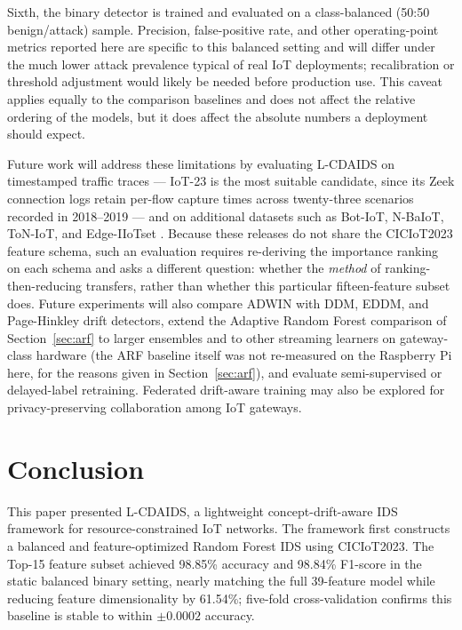 \documentclass[11pt,a4paper]{article}
\begin{document}
Sixth, the binary detector is trained and evaluated on a class-balanced
(50:50 benign/attack) sample. Precision, false-positive rate, and other
operating-point metrics reported here are specific to this balanced
setting and will differ under the much lower attack prevalence typical
of real IoT deployments; recalibration or threshold adjustment would
likely be needed before production use. This caveat applies equally to
the comparison baselines and does not affect the relative ordering of
the models, but it does affect the absolute numbers a deployment should
expect.

Future work will address these limitations by evaluating L-CDAIDS on
timestamped traffic traces --- IoT-23 \cite{garcia2020iot23} is the most
suitable candidate, since its Zeek connection logs retain per-flow capture
times across twenty-three scenarios recorded in 2018--2019 --- and on
additional datasets such as Bot-IoT, N-BaIoT, ToN-IoT, and Edge-IIoTset
\cite{koroniotis2019,meidan2018,moustafa2021,ferrag2022}. Because these
releases do not share the CICIoT2023 feature schema, such an evaluation
requires re-deriving the importance ranking on each schema and asks a
different question: whether the \emph{method} of ranking-then-reducing
transfers, rather than whether this particular fifteen-feature subset does. Future
experiments will also compare ADWIN with DDM, EDDM, and Page-Hinkley
drift detectors, extend the Adaptive Random Forest comparison of
Section~\ref{sec:arf} to larger ensembles and to other streaming
learners on gateway-class hardware (the ARF baseline itself was not
re-measured on the Raspberry Pi here, for the reasons given in
Section~\ref{sec:arf}), and evaluate semi-supervised or delayed-label
retraining. Federated drift-aware training may also be explored for
privacy-preserving collaboration among IoT gateways.

\section{Conclusion}
\label{sec:conclusion}

This paper presented L-CDAIDS, a lightweight concept-drift-aware IDS
framework for resource-constrained IoT networks. The
framework first constructs a balanced and feature-optimized Random
Forest IDS using CICIoT2023. The Top-15 feature subset achieved 98.85\%
accuracy and 98.84\% F1-score in the static balanced binary setting,
nearly matching the full 39-feature model while reducing feature
dimensionality by 61.54\%; five-fold cross-validation confirms this
baseline is stable to within $\pm 0.0002$ accuracy.
\end{document}
